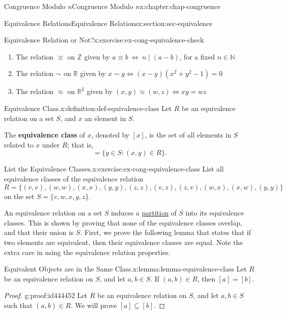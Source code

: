 \documentclass[oneside,10pt,]{book}
\newcommand{\terminology}[1]{\textbf{#1}}
\numberwithin{equation}{section}
\begin{document}
\begin{chapterptx}{Congruence Modulo \(n\)}{}{Congruence Modulo \(n\)}{}{}{x:chapter:chap-congruence}
\begin{sectionptx}{Equivalence Relations}{}{Equivalence Relations}{}{}{x:section:sec-equivalence}
\begin{inlineexercise}{Equivalence Relation or Not?}{x:exercise:ex-cong-equivalence-check}
\begin{enumerate}[label=(\alph*)]
\item{}The relation \(\equiv\) on \(\mathbb{Z}\) given by \(a \equiv b \ \Leftrightarrow \ n \mid (a-b)\), for a fixed \(n \in \mathbb{N}\)%
\item{}The relation \(\sim\) on \(\mathbb{R}\) given by \(x \sim y \Leftrightarrow (x-y)(x^2+y^2-1) = 0\)%
\item{}The relation \(\approx\) on \(\mathbb{R}^2\) given by \((x,y) \approx (w,z) \Leftrightarrow xy = wz\)%
\end{enumerate}
%
\end{inlineexercise}
\begin{definition}{Equivalence Class.}{x:definition:def-equivalence-class}%
\label{g:notation:id444339}%
Let \(R\) be an equivalence relation on a set \(S\), and \(x\) an element in \(S\).%
\par
The \terminology{equivalence class} of \(x\), denoted by \([x]\), is the set of all elements in \(S\) related to \(x\) under \(R\); that is,%
\begin{equation*}
[x] = \{y \in S : (x,y) \in R\}\text{.}
\end{equation*}
%
\end{definition}
\begin{inlineexercise}{List the Equivalence Classes.}{x:exercise:ex-cong-equivalence-class}%
List all equivalence classes of the equivalence relation%
\begin{equation*}
R = \{(v,v),(w,w),(x,x),(y,y),(z,z),(v,z),(z,v),(w,x),(x,w),(y,y)\}
\end{equation*}
on the set \(S = \{v,w,x,y,z\}\).%
\end{inlineexercise}
An equivalence relation on a set \(S\) induces a \hyperref[x:definition:def-partition]{partition} of \(S\) into its equivalence classes. This is shown by proving that none of the equivalence classes overlap, and that their union is \(S\). First, we prove the following lemma that states that if two elements are equivalent, then their equivalence classes are equal. Note the extra care in using the equivalence relation properties.%
\begin{lemma}{Equivalent Objects are in the Same Class.}{}{x:lemma:lemma-equivalence-class}%
Let \(R\) be an equivalence relation on \(S\), and let \(a, b \in S\). If \((a,b) \in R\), then \([a] = [b]\).%
\end{lemma}
\begin{proof}{}{g:proof:id444452}
Let \(R\) be an equivalence relation on \(S\), and let \(a, b \in S\) such that \((a,b) \in R\). We will prove \([a] \subseteq [b]\).%

\end{proof}
\end{sectionptx}
\end{chapterptx}
\end{document}
